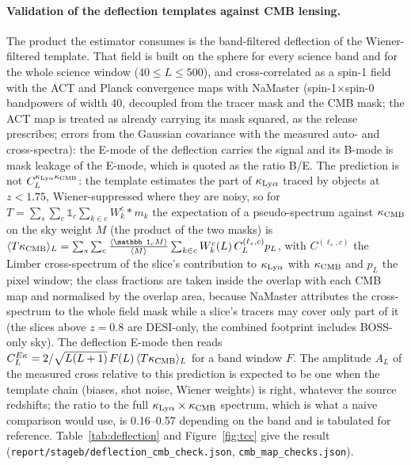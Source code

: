 \documentclass[11pt,a4paper]{article}
\newcommand{\kl}{\kappa_{{\rm Ly}\alpha}}
\newcommand{\kc}{\kappa_{\rm CMB}}
\begin{document}
\paragraph{Validation of the deflection templates against CMB lensing.} The product the estimator consumes is the band-filtered deflection of the Wiener-filtered template. That field is built on the sphere for every science band and for the whole science window ($40\le L\le500$), and cross-correlated as a spin-1 field with the ACT and Planck convergence maps with NaMaster (spin-1$\times$spin-0 bandpowers of width 40, decoupled from the tracer mask and the CMB mask; the ACT map is treated as already carrying its mask squared, as the release prescribes; errors from the Gaussian covariance with the measured auto- and cross-spectra): the E-mode of the deflection carries the signal and its B-mode is mask leakage of the E-mode, which is quoted as the ratio B/E. The prediction is not $C_L^{\kl\kc}$: the template estimates the part of $\kl$ traced by objects at $z<1.75$, Wiener-suppressed where they are noisy, so for $T=\sum_s\sum_c\mathbb 1_c\sum_{k\in c}W^c_k\ast m_k$ the expectation of a pseudo-spectrum against $\kc$ on the sky weight $M$ (the product of the two masks) is $\langle T\kc\rangle_L=\sum_s\sum_c\frac{\langle\mathbb 1_cM\rangle}{\langle M\rangle}\sum_{k\in c}W^c_k(L)\,C_L^{(\ell_s,c)}p_L$, with $C^{(\ell_s,c)}$ the Limber cross-spectrum of the slice's contribution to $\kl$ with $\kc$ and $p_L$ the pixel window; the class fractions are taken inside the overlap with each CMB map and normalised by the overlap area, because NaMaster attributes the cross-spectrum to the whole field mask while a slice's tracers may cover only part of it (the slices above $z=0.8$ are DESI-only, the combined footprint includes BOSS-only sky). The deflection E-mode then reads $C_L^{E\kappa}=2/\sqrt{L(L+1)}\,F(L)\,\langle T\kc\rangle_L$ for a band window $F$. The amplitude $A_L$ of the measured cross relative to this prediction is expected to be one when the template chain (biases, shot noise, Wiener weights) is right, whatever the source redshifts; the ratio to the full $\kl\times\kc$ spectrum, which is what a naive comparison would use, is 0.16--0.57 depending on the band and is tabulated for reference. Table~\ref{tab:deflection} and Figure~\ref{fig:tcc} give the result (\texttt{report/stageb/deflection\_cmb\_check.json}, \texttt{cmb\_map\_checks.json}).
\end{document}
